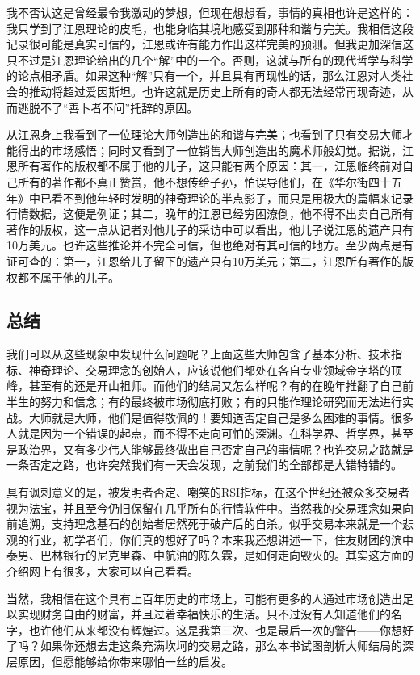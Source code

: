 我不否认这是曾经最令我激动的梦想，但现在想想看，事情的真相也许是这样的：我只学到了江恩理论的皮毛，也能身临其境地感受到那种和谐与完美。我相信这段记录很可能是真实可信的，江恩或许有能力作出这样完美的预测。但我更加深信这只不过是江恩理论给出的几个“解”中的一个。否则，这就与所有的现代哲学与科学的论点相矛盾。如果这种“解”只有一个，并且具有再现性的话，那么江恩对人类社会的推动将超过爱因斯坦。也许这就是历史上所有的奇人都无法经常再现奇迹，从而逃脱不了“善卜者不问”托辞的原因。

从江恩身上我看到了一位理论大师创造出的和谐与完美；也看到了只有交易大师才能得出的市场感悟；同时又看到了一位销售大师创造出的魔术师般幻觉。据说，江恩所有著作的版权都不属于他的儿子，这只能有两个原因：其一，江恩临终前对自己所有的著作都不真正赞赏，他不想传给子孙，怕误导他们，在《华尔街四十五年》中已看不到他年轻时发明的神奇理论的半点影子，而只是用极大的篇幅来记录行情数据，这便是例证；其二，晚年的江恩已经穷困潦倒，他不得不出卖自己所有著作的版权，这一点从记者对他儿子的采访中可以看出，他儿子说江恩的遗产只有10万美元。也许这些推论并不完全可信，但也绝对有其可信的地方。至少两点是有证可查的：第一，江恩给儿子留下的遗产只有10万美元；第二，江恩所有著作的版权都不属于他的儿子。

\subsection{总结}

我们可以从这些现象中发现什么问题呢？上面这些大师包含了基本分析、技术指标、神奇理论、交易理念的创始人，应该说他们都处在各自专业领域金字塔的顶峰，甚至有的还是开山祖师。而他们的结局又怎么样呢？有的在晚年推翻了自己前半生的努力和信念；有的最终被市场彻底打败；有的只能作理论研究而无法进行实战。大师就是大师，他们是值得敬佩的！要知道否定自己是多么困难的事情。很多人就是因为一个错误的起点，而不得不走向可怕的深渊。在科学界、哲学界，甚至是政治界，又有多少伟人能够最终做出自己否定自己的事情呢？也许交易之路就是一条否定之路，也许突然我们有一天会发现，之前我们的全部都是大错特错的。

具有讽刺意义的是，被发明者否定、嘲笑的RSI指标，在这个世纪还被众多交易者视为法宝，并且至今仍旧保留在几乎所有的行情软件中。当然我的交易理念如果向前追溯，支持理念基石的创始者居然死于破产后的自杀。似乎交易本来就是一个悲观的行业，初学者们，你们真的想好了吗？本来我还想讲述一下，住友财团的滨中泰男、巴林银行的尼克里森、中航油的陈久霖，是如何走向毁灭的。其实这方面的介绍网上有很多，大家可以自己看看。

当然，我相信在这个具有上百年历史的市场上，可能有更多的人通过市场创造出足以实现财务自由的财富，并且过着幸福快乐的生活。只不过没有人知道他们的名字，也许他们从来都没有辉煌过。这是我第三次、也是最后一次的警告——你想好了吗？如果你还想去走这条充满坎坷的交易之路，那么本书试图剖析大师结局的深层原因，但愿能够给你带来哪怕一丝的启发。

\clearpage
